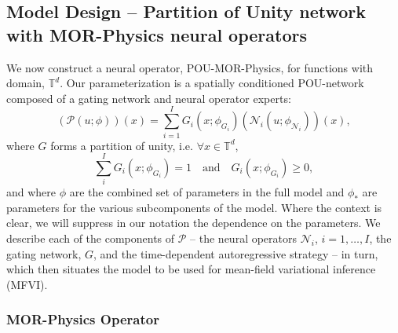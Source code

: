 \subsection{Model Design -- Partition of Unity network with MOR-Physics neural operators}\label{sec:model}

We now construct a neural operator, POU-MOR-Physics, for functions with domain, $\mathbb{T}^d$. 
Our parameterization is a spatially conditioned POU-network composed of a gating network and neural operator experts:
\begin{equation}\label{eq:pou_model}
    (\mathcal{P} (u;\phi)) (x) = \sum_{i=1}^I G_i(x;\phi_{G_i}) (\mathcal{N}_i(u;\phi_{\mathcal{N}_i}))  (x),
\end{equation}
where $G$ forms a partition of unity, i.e. $\forall x \in \mathbb{T}^d$,
\begin{equation}
    \sum_i^I G_i (x;\phi_{G_i}) = 1 \quad \text{and} \quad G_i(x;\phi_{G_i}) \ge 0,
\end{equation}
and where $\phi$ are the combined set of parameters in the full model and $\phi_*$ are parameters for the various subcomponents of the model. Where the context is clear, we will suppress in our notation the dependence on the parameters. We describe each of the components of \(\mathcal{P}\) -- the neural operators $\mathcal{N}_i$, $i=1,\dots,I$,  the gating network, $G$, and the time-dependent autoregressive strategy -- in turn, which then situates the model to be used for mean-field variational inference (MFVI).

\subsubsection{MOR-Physics Operator}

